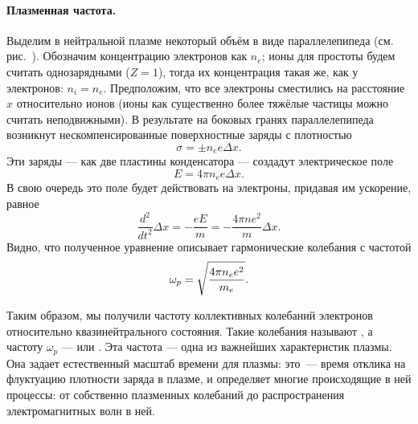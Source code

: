 \paragraph{Плазменная частота.}
Выделим в нейтральной плазме некоторый объём в виде параллелепипеда
(см. рис.~).
Обозначим концентрацию электронов как $n_e$; ионы для простоты будем считать
однозарядными ($Z=1$), тогда их концентрация такая же, как у электронов: $n_i=n_e$.
Предположим, что все электроны сместились на расстояние $x$ относительно ионов
(ионы как существенно более тяжёлые частицы можно считать неподвижными).
В результате на боковых гранях параллелепипеда возникнут нескомпенсированные
поверхностные заряды с плотностью
\begin{equation*}
    \sigma = \pm n_e e \Delta x.
\end{equation*}
Эти заряды --- как две пластины конденсатора --- создадут электрическое поле
\begin{equation*}
    E=4\pi n_e e \Delta x.
\end{equation*}
В свою очередь это поле будет действовать на электроны,
придавая им ускорение, равное
\begin{equation*}
    \frac{d^2}{dt^2}\Delta x=-\frac{eE}{m}=-\frac{4\pi ne^2}{m} \Delta x.
\end{equation*}
Видно, что полученное уравнение описывает гармонические колебания с частотой
\begin{equation}
    \eqmark{plasma-freq}
    \omega_p=\sqrt{\frac{4\pi n_e e^2}{m_e}}.
\end{equation}

Таким образом, мы получили частоту коллективных колебаний
электронов относительно квазинейтрального состояния. Такие колебания
называют , а частоту $\omega_p$ ---
 или . Эта частота ---
одна из важнейших характеристик плазмы.
Она задает естественный масштаб времени для плазмы: это~--- время
отклика на флуктуацию плотности заряда в плазме,
и определяет многие происходящие в ней процессы: от собственно плазменных
колебаний до распространения электромагнитных волн в ней.


